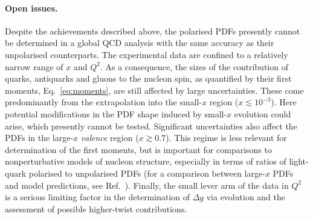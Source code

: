\paragraph{Open issues.}

Despite the achievements described above, the polarised PDFs presently cannot 
be determined in a global QCD analysis with the same accuracy as their 
unpolarised counterparts.
%
The experimental data are confined to a relatively narrow range of 
$x$ and $Q^2$.
%
As a consequence, the sizes of the contribution of quarks, antiquarks and 
gluons to the nucleon spin, as quantified by their first moments, 
Eq.~\eqref{eq:moments}, are still affected by large uncertainties. 
%
These come predominantly from the extrapolation into the small-$x$ region 
($x\lesssim 10^{-3}$). 
%
Here potential modifications in the PDF shape induced by small-$x$ evolution 
could arise, which presently cannot be tested.
%
Significant uncertainties also affect the PDFs in the large-$x$ 
{\it valence} region ($x\gtrsim 0.7$). 
%
This regime is less relevant for determination of the first moments, but is 
important for comparisons to nonperturbative models of nucleon structure, 
especially in terms of ratios of light-quark polarised to unpolarised PDFs 
(for a comparison between large-$x$ PDFs 
and model predictions, see Ref.~\cite{Nocera:2014uea}).
%
Finally, the small lever arm of the data in $Q^2$ is a serious limiting factor 
in the determination of $\Delta g$ via evolution and the assessment of possible 
higher-twist contributions. 

